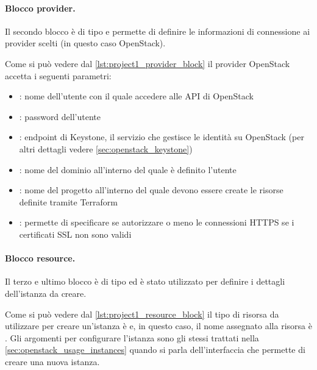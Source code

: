 \paragraph{Blocco provider.}
Il secondo blocco è di tipo  e permette di definire le informazioni di connessione ai provider scelti (in questo caso OpenStack).

\noindent
Come si può vedere dal \cref{lst:project1_provider_block} il provider OpenStack accetta i seguenti parametri:
\begin{itemize}
    \item {}: nome dell'utente con il quale accedere alle API di OpenStack
    \item {}: password dell'utente
    \item {}: endpoint di Keystone, il servizio che gestisce le identità su OpenStack (per altri dettagli vedere \cref{sec:openstack_keystone})
    \item {}: nome del dominio all'interno del quale è definito l'utente
    \item {}: nome del progetto all'interno del quale devono essere create le risorse definite tramite Terraform
    \item {}: permette di specificare se autorizzare o meno le connessioni HTTPS se i certificati SSL non sono validi
\end{itemize}



\paragraph{Blocco resource.}
Il terzo e ultimo blocco è di tipo  ed è stato utilizzato per definire i dettagli dell'istanza da creare. 

\noindent
Come si può vedere dal \cref{lst:project1_resource_block} il tipo di risorsa da utilizzare per creare un'istanza è  e, in questo caso, il nome assegnato alla risorsa è . Gli argomenti per configurare l'istanza sono gli stessi trattati nella \cref{sec:openstack_usage_instances} quando si parla dell'interfaccia che permette di creare una nuova istanza.

